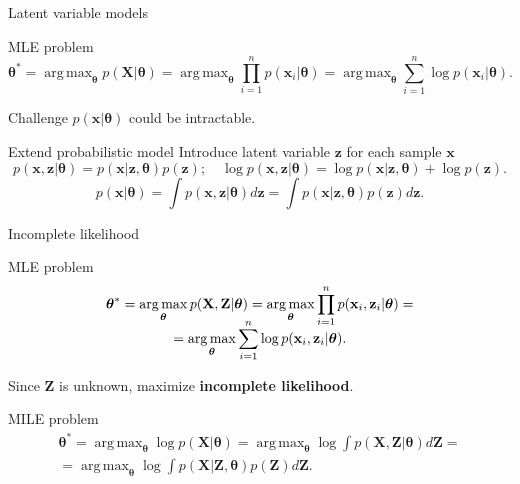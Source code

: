 \documentclass{beamer}
\newcommand{\bx}{\mathbf{x}}
\newcommand{\bz}{\mathbf{z}}
\newcommand{\bX}{\mathbf{X}}
\newcommand{\bZ}{\mathbf{Z}}
\newcommand{\btheta}{\boldsymbol{\theta}}
\DeclareMathOperator*{\argmax}{arg\,max}
\begin{document}
\begin{frame}{Latent variable models}
	\begin{block}{MLE problem}
		\vspace{-0.3cm}
		\[
		\btheta^* = \argmax_{\btheta} p(\bX | \btheta) = \argmax_{\btheta} \prod_{i=1}^n p(\bx_i | \btheta) = \argmax_{\btheta} \sum_{i=1}^n \log p(\bx_i | \btheta).
		\]
		\vspace{-0.3cm}
	\end{block}
	\begin{block}{Challenge}
		$p(\bx | \btheta)$ could be intractable.
	\end{block}
	\begin{block}{Extend probabilistic model}
		Introduce latent variable $\bz$ for each sample $\bx$
		\[
		p(\bx, \bz | \btheta) = p(\bx | \bz, \btheta) p(\bz); \quad 
		\log p(\bx, \bz | \btheta) = \log p(\bx | \bz, \btheta) + \log p(\bz).
		\]
		\[
		p(\bx | \btheta) = \int p(\bx, \bz | \btheta) d\bz = \int p(\bx | \bz, \btheta) p(\bz) d\bz.
		\]
	\end{block}
\end{frame}
\begin{frame}{Incomplete likelihood}
\begin{block}{MLE problem}
	\vspace{-0.3cm}
	\begin{multline*}
		\vspace{-0.3cm}
		\btheta^* = \argmax_{\btheta} p(\bX, \bZ | \btheta) = \argmax_{\btheta} \prod_{i=1}^n p(\bx_i, \bz_i | \btheta) = \\ = \argmax_{\btheta} \sum_{i=1}^n \log p(\bx_i, \bz_i | \btheta).
	\end{multline*}
	\vspace{-0.3cm}
\end{block}
Since $\bZ$ is unknown, maximize \textbf{incomplete likelihood}.
\begin{block}{MILE problem}
	\vspace{-0.3cm}
	\begin{multline*}
		\btheta^* = \argmax_{\btheta} \log p(\bX| \btheta) = \argmax_{\btheta} \log \int p(\bX, \bZ | \btheta) d \bZ = \\ = \argmax_{\btheta} \log \int p(\bX| \bZ, \btheta) p(\bZ) d\bZ.
	\end{multline*}
	\vspace{-0.3cm}
\end{block}

\end{frame}
\end{document}
